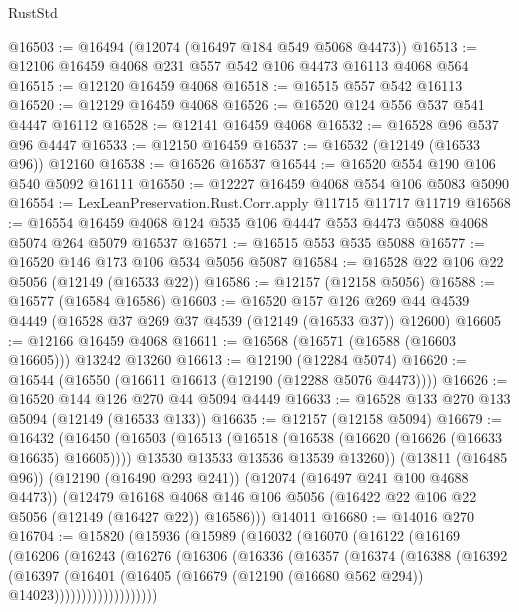 \begin{lexlean}{RustStd}
\begin{coremodule}
@16503 := @16494 (@12074 (@16497 @184 @549 @5068 @4473))
@16513 := @12106 @16459 @4068 @231 @557 @542 @106 @4473 @16113 @4068 @564
@16515 := @12120 @16459 @4068
@16518 := @16515 @557 @542 @16113
@16520 := @12129 @16459 @4068
@16526 := @16520 @124 @556 @537 @541 @4447 @16112
@16528 := @12141 @16459 @4068
@16532 := @16528 @96 @537 @96 @4447
@16533 := @12150 @16459
@16537 := @16532 (@12149 (@16533 @96)) @12160
@16538 := @16526 @16537
@16544 := @16520 @554 @190 @106 @540 @5092 @16111
@16550 := @12227 @16459 @4068 @554 @106 @5083 @5090
@16554 := LexLeanPreservation.Rust.Corr.apply @11715 @11717 @11719
@16568 := @16554 @16459 @4068 @124 @535 @106 @4447 @553 @4473 @5088 @4068 @5074 @264 @5079 @16537
@16571 := @16515 @553 @535 @5088
@16577 := @16520 @146 @173 @106 @534 @5056 @5087
@16584 := @16528 @22 @106 @22 @5056 (@12149 (@16533 @22))
@16586 := @12157 (@12158 @5056)
@16588 := @16577 (@16584 @16586)
@16603 := @16520
    @157
    @126
    @269
    @44
    @4539
    @4449
    (@16528 @37 @269 @37 @4539 (@12149 (@16533 @37)) @12600)
@16605 := @12166 @16459 @4068
@16611 := @16568 (@16571 (@16588 (@16603 @16605))) @13242 @13260
@16613 := @12190 (@12284 @5074)
@16620 := @16544 (@16550 (@16611 @16613 (@12190 (@12288 @5076 @4473))))
@16626 := @16520 @144 @126 @270 @44 @5094 @4449
@16633 := @16528 @133 @270 @133 @5094 (@12149 (@16533 @133))
@16635 := @12157 (@12158 @5094)
@16679 := @16432
    (@16450
      (@16503
        (@16513
          (@16518 (@16538 (@16620 (@16626 (@16633 @16635) @16605))))
          @13530
          @13533
          @13536
          @13539
          @13260))
      (@13811 (@16485 @96))
      (@12190 (@16490 @293 @241))
      (@12074 (@16497 @241 @100 @4688 @4473))
      (@12479
        @16168
        @4068
        @146
        @106
        @5056
        (@16422 @22 @106 @22 @5056 (@12149 (@16427 @22)) @16586)))
    @14011
@16680 := @14016 @270
@16704 := @15820
    (@15936
      (@15989
        (@16032
          (@16070
            (@16122
              (@16169
                (@16206
                  (@16243
                    (@16276
                      (@16306
                        (@16336
                          (@16357
                            (@16374
                              (@16388
                                (@16392
                                  (@16397
                                    (@16401
                                      (@16405
                                        (@16679
                                          (@12190 (@16680 @562 @294))
                                          @14023)))))))))))))))))))

\end{coremodule}
\end{lexlean}
